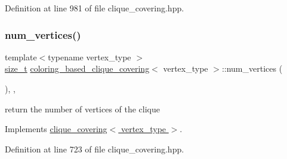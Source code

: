 Definition at line 981 of file clique\+\_\+covering.\+hpp.

\mbox{\label{classcoloring__based__clique__covering_a269c97e1310e645981964a841f8e5b75}} 
\subsubsection{\texorpdfstring{num\+\_\+vertices()}{num\_vertices()}}
{\footnotesize\ttfamily template$<$typename vertex\+\_\+type $>$ \\
\hyperlink{tutorial__fpt__2017_2intro_2sixth_2test_8c_a7c94ea6f8948649f8d181ae55911eeaf}{size\+\_\+t} \hyperlink{classcoloring__based__clique__covering}{coloring\+\_\+based\+\_\+clique\+\_\+covering}$<$ vertex\+\_\+type $>$\+::num\+\_\+vertices (\begin{DoxyParamCaption}{ }\end{DoxyParamCaption})\hspace{0.3cm}{\ttfamily [inline]}, {\ttfamily [override]}, {\ttfamily [virtual]}}



return the number of vertices of the clique 



Implements \hyperlink{classclique__covering_ad387948a7851179bb056e68c72097008}{clique\+\_\+covering$<$ vertex\+\_\+type $>$}.



Definition at line 723 of file clique\+\_\+covering.\+hpp.

\mbox{\label{classcoloring__based__clique__covering_a8ebd9dc934acf7724e6793398991ad94}} 
